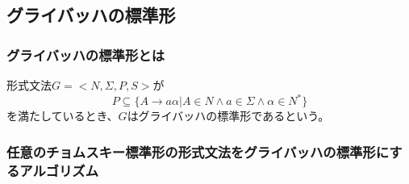 \documentclass[a4paper]{jarticle}
\begin{document}
\subsection{グライバッハの標準形}
\subsubsection{グライバッハの標準形とは}
形式文法$ G = < N , \Sigma , P , S > $が
\begin{equation}
P \subseteq \bigl\{ A \to a \alpha | A \in N \land a \in \Sigma \land \alpha \in N ^* \bigr\}
\end{equation}
を満たしているとき、$ G $はグライバッハの標準形であるという。\\
\subsubsection{任意のチョムスキー標準形の形式文法をグライバッハの標準形にするアルゴリズム}
\end{document}

